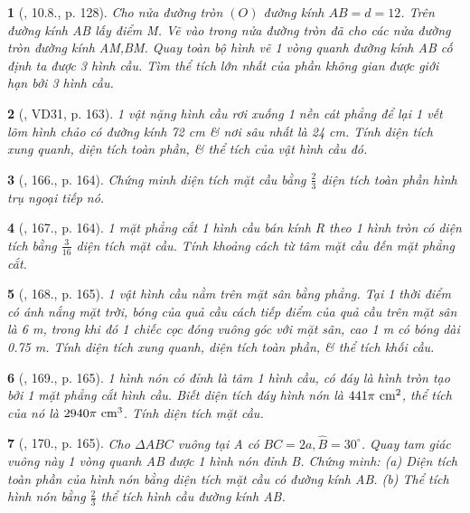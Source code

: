 \documentclass{article}
\newtheorem{baitoan}{}
\begin{document}
\begin{baitoan}[\cite{Binh_boi_duong_Toan_9_tap_2}, 10.8., p. 128]
	Cho nửa đường tròn $(O)$ đường kính $AB = d = 12$. Trên đường kính AB lấy điểm M. Vẽ vào trong nửa đường tròn đã cho các nửa đường tròn đường kính AM,BM. Quay toàn bộ hình vẽ 1 vòng quanh đường kính AB cố định ta được 3 hình cầu. Tìm thể tích lớn nhất của phần không gian được giới hạn bởi 3 hình cầu.
\end{baitoan}

\begin{baitoan}[\cite{Tuyen_Toan_9_old}, VD31, p. 163]
	1 vật nặng hình cầu rơi xuống 1 nền cát phẳng để lại 1 vết lõm hình chảo có đường kính {\rm72 cm} \& nơi sâu nhất là {\rm24 cm}. Tính diện tích xung quanh, diện tích toàn phần, \& thể tích của vật hình cầu đó.
\end{baitoan}

\begin{baitoan}[\cite{Tuyen_Toan_9_old}, 166., p. 164]
	Chứng minh diện tích mặt cầu bằng $\frac{2}{3}$ diện tích toàn phần hình trụ ngoại tiếp nó.
\end{baitoan}

\begin{baitoan}[\cite{Tuyen_Toan_9_old}, 167., p. 164]
	1 mặt phẳng cắt 1 hình cầu bán kính R theo 1 hình tròn có diện tích bằng $\frac{3}{16}$ diện tích mặt cầu. Tính khoảng cách từ tâm mặt cầu đến mặt phẳng cắt.
\end{baitoan}

\begin{baitoan}[\cite{Tuyen_Toan_9_old}, 168., p. 165]
	1 vật hình cầu nằm trên mặt sân bằng phẳng. Tại 1 thời điểm có ánh nắng mặt trời, bóng của quả cầu cách tiếp điểm của quả cầu trên mặt sân là {\rm6 m}, trong khi đó 1 chiếc cọc đóng vuông góc với mặt sân, cao {\rm1 m} có bóng dài {\rm0.75 m}. Tính diện tích xung quanh, diện tích toàn phần, \& thể tích khối cầu.
\end{baitoan}

\begin{baitoan}[\cite{Tuyen_Toan_9_old}, 169., p. 165]
	1 hình nón có đỉnh là tâm 1 hình cầu, có đáy là hình tròn tạo bởi 1 mặt phẳng cắt hình cầu. Biết diện tích đáy hình nón là $441\pi\ {\rm cm}^2$, thể tích của nó là $2940\pi\ {\rm cm}^3$. Tính diện tích mặt cầu.
\end{baitoan}

\begin{baitoan}[\cite{Tuyen_Toan_9_old}, 170., p. 165]
	Cho $\Delta ABC$ vuông tại A có $BC = 2a,\widehat{B} = 30^\circ$. Quay tam giác vuông này 1 vòng quanh AB được 1 hình nón đỉnh B. Chứng minh: (a) Diện tích toàn phần của hình nón bằng diện tích mặt cầu có đường kính AB. (b) Thể tích hình nón bằng $\frac{2}{3}$ thể tích hình cầu đường kính AB.
\end{baitoan}
\end{document}
